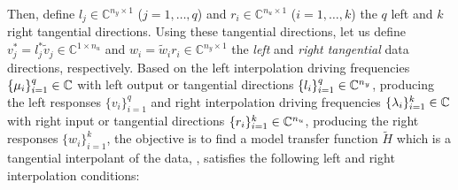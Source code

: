 \documentclass[graybox]{svmult}
\begin{document}
Then, define $l_j \in \mathds C^{n_y\times 1}$ ($j=1,\dots , q$) and $r_i \in \mathds C^{n_u\times 1}$ ($i=1,\dots , k$) the $q$ left and $k$ right tangential directions. Using these tangential directions, let us define $v_j^*=l_j^*\tilde{v}_j \in \mathds C^{1\times n_u}$ and $w_i=\tilde{w}_i r_i \in \mathds C^{n_y\times 1}$ the \emph{left} and \emph{right tangential} data directions, respectively. Based on the left interpolation driving frequencies $\{\mu_i\}_{i=1}^q \in \mathbb{C}$ with left output or tangential directions $\{l_i\}_{i=1}^q \in \mathbb{C}^{n_y}$, producing the left responses $\{v_i\}_{i=1}^q$ and right interpolation driving frequencies $\{\lambda_i\}_{i=1}^k \in \mathbb{C}$ with right input or tangential directions $\{r_i\}_{i=1}^k \in \mathbb{C}^{n_u}$, producing the right responses $\{w_i\}_{i=1}^k$, the objective is to find a model transfer function $\tilde H$ which is a tangential interpolant of the data, \ie, satisfies the following left and right interpolation conditions:
\end{document}

